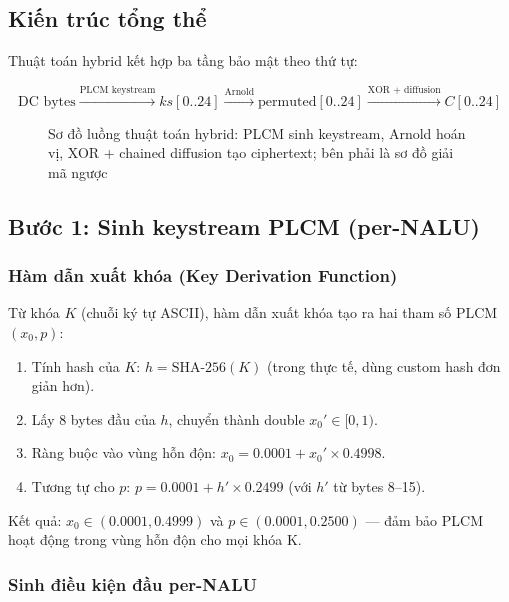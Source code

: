 \subsection{Kiến trúc tổng thể}

Thuật toán hybrid kết hợp ba tầng bảo mật theo thứ tự:

\begin{equation}
\text{DC bytes} \xrightarrow{\text{PLCM keystream}} ks[0..24]
\xrightarrow{\text{Arnold}} \text{permuted}[0..24]
\xrightarrow{\text{XOR + diffusion}} C[0..24]
\end{equation}

\begin{figure}[ht]
\centering

\caption{Sơ đồ luồng thuật toán hybrid: PLCM sinh keystream, Arnold hoán vị,
         XOR + chained diffusion tạo ciphertext; bên phải là sơ đồ giải mã ngược}
\label{fig:hybrid_flowchart}
\end{figure}

\subsection{Bước 1: Sinh keystream PLCM (per-NALU)}

\subsubsection{Hàm dẫn xuất khóa (Key Derivation Function)}

Từ khóa $K$ (chuỗi ký tự ASCII), hàm dẫn xuất khóa tạo ra hai tham số PLCM
$(x_0, p)$:

\begin{enumerate}
  \item Tính hash của $K$: $h = \text{SHA-256}(K)$ (trong thực tế, dùng custom hash đơn giản hơn).
  \item Lấy 8 bytes đầu của $h$, chuyển thành double $x_0' \in [0, 1)$.
  \item Ràng buộc vào vùng hỗn độn: $x_0 = 0.0001 + x_0' \times 0.4998$.
  \item Tương tự cho $p$: $p = 0.0001 + h' \times 0.2499$ (với $h'$ từ bytes 8--15).
\end{enumerate}

Kết quả: $x_0 \in (0.0001, 0.4999)$ và $p \in (0.0001, 0.2500)$ --- đảm bảo
PLCM hoạt động trong vùng hỗn độn cho mọi khóa K.

\subsubsection{Sinh điều kiện đầu per-NALU}

